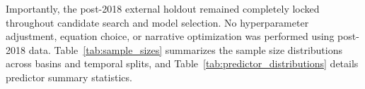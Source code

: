 Importantly, the post-2018 external holdout remained completely locked throughout candidate search and model selection. No hyperparameter adjustment, equation choice, or narrative optimization was performed using post-2018 data. Table~\ref{tab:sample_sizes} summarizes the sample size distributions across basins and temporal splits, and Table~\ref{tab:predictor_distributions} details predictor summary statistics.



